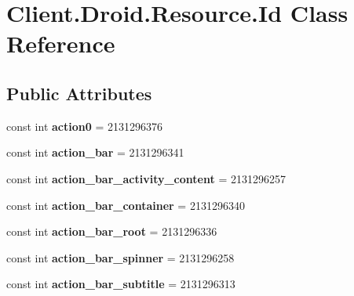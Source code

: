 \hypertarget{classClient_1_1Droid_1_1Resource_1_1Id}{}\section{Client.\+Droid.\+Resource.\+Id Class Reference}
\label{classClient_1_1Droid_1_1Resource_1_1Id}
\subsection*{Public Attributes}
\begin{DoxyCompactItemize}
\item 
\hypertarget{classClient_1_1Droid_1_1Resource_1_1Id_aae8bbd33832b4a37185d54124bdd9b17}{}const int {\bfseries action0} = 2131296376\label{classClient_1_1Droid_1_1Resource_1_1Id_aae8bbd33832b4a37185d54124bdd9b17}

\item 
\hypertarget{classClient_1_1Droid_1_1Resource_1_1Id_addcceb1ced6a8206d89bda289ad23957}{}const int {\bfseries action\+\_\+bar} = 2131296341\label{classClient_1_1Droid_1_1Resource_1_1Id_addcceb1ced6a8206d89bda289ad23957}

\item 
\hypertarget{classClient_1_1Droid_1_1Resource_1_1Id_a21c161b728248082bbfdecd13fec9caf}{}const int {\bfseries action\+\_\+bar\+\_\+activity\+\_\+content} = 2131296257\label{classClient_1_1Droid_1_1Resource_1_1Id_a21c161b728248082bbfdecd13fec9caf}

\item 
\hypertarget{classClient_1_1Droid_1_1Resource_1_1Id_a3d0d413002563020efea50dc0fb3e3b6}{}const int {\bfseries action\+\_\+bar\+\_\+container} = 2131296340\label{classClient_1_1Droid_1_1Resource_1_1Id_a3d0d413002563020efea50dc0fb3e3b6}

\item 
\hypertarget{classClient_1_1Droid_1_1Resource_1_1Id_a1342a114a204d41f363dcae2d4ee8f32}{}const int {\bfseries action\+\_\+bar\+\_\+root} = 2131296336\label{classClient_1_1Droid_1_1Resource_1_1Id_a1342a114a204d41f363dcae2d4ee8f32}

\item 
\hypertarget{classClient_1_1Droid_1_1Resource_1_1Id_a9a469afced0ae50ae598761a8c337c8e}{}const int {\bfseries action\+\_\+bar\+\_\+spinner} = 2131296258\label{classClient_1_1Droid_1_1Resource_1_1Id_a9a469afced0ae50ae598761a8c337c8e}

\item 
\hypertarget{classClient_1_1Droid_1_1Resource_1_1Id_a160a5ed93e83159f6f6c1ad728fa6109}{}const int {\bfseries action\+\_\+bar\+\_\+subtitle} = 2131296313\label{classClient_1_1Droid_1_1Resource_1_1Id_a160a5ed93e83159f6f6c1ad728fa6109}


\end{DoxyCompactItemize}
